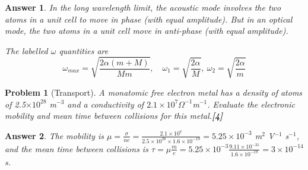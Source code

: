 \documentclass[a4paper]{article}
\newtheorem{ans}{Answer}[subsection]
\theoremstyle{new}
\newtheorem{qns}{Problem}[subsection]
\begin{document}
\begin{ans}
In the long wavelength limit, the acoustic mode involves the two atoms in a unit cell to move in phase (with equal amplitude). But in an optical mode, the two atoms in a unit cell move in anti-phase (with equal amplitude).
\begin{center}
\end{center}
The labelled $\omega$ quantities are
$$\omega_{max}=\sqrt{\frac{2\alpha(m+M)}{Mm}},\quad\omega_1=\sqrt{\frac{2\alpha}{M}},~\omega_2=\sqrt{\frac{2\alpha}{m}}$$
\end{ans}
\begin{qns}[Transport]
A monatomic free electron metal has a density of atoms of 2.5$\times10^{28}$ m$^{−3}$ and a conductivity of $2.1\times 10^7\Omega^{−1}$m$^{−1}$. Evaluate the electronic mobility and mean time between collisions for this metal.\hfill\textbf{[4]}
\end{qns}
\begin{ans}
The mobility is $\mu=\frac{\sigma}{ne}=\frac{2.1\times10^7}{2.5\times10^{28}\times 1.6\times10^{-19}}=5.25\times10^{-3}$ m$^2$ V$^{-1}$ s$^{-1}$, and the mean time between collisions is $\tau=\mu\frac{m}{e}=5.25\times10^{-3}\frac{9.11\times10^{-31}}{1.6\times10^{-19}}=3\times10^{-14}$ s.
\end{ans}
\end{document}
